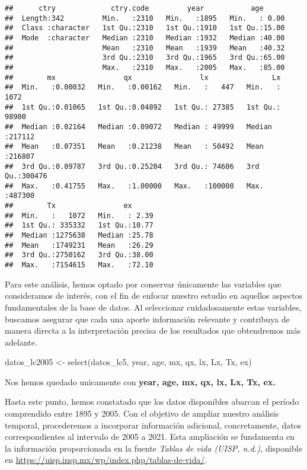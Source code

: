 \documentclass[
]{article}
\newenvironment{Shaded}{\begin{snugshade}}{\end{snugshade}}
\newcommand{\FunctionTok}[1]{\textcolor[rgb]{0.00,0.00,0.00}{#1}}
\newcommand{\NormalTok}[1]{#1}
\newcommand{\OtherTok}[1]{\textcolor[rgb]{0.56,0.35,0.01}{#1}}
\begin{document}
\begin{verbatim}
##      ctry             ctry.code         year           age       
##  Length:342         Min.   :2310   Min.   :1895   Min.   : 0.00  
##  Class :character   1st Qu.:2310   1st Qu.:1910   1st Qu.:15.00  
##  Mode  :character   Median :2310   Median :1932   Median :40.00  
##                     Mean   :2310   Mean   :1939   Mean   :40.32  
##                     3rd Qu.:2310   3rd Qu.:1965   3rd Qu.:65.00  
##                     Max.   :2310   Max.   :2005   Max.   :85.00  
##        mx                qx                lx               Lx        
##  Min.   :0.00032   Min.   :0.00162   Min.   :   447   Min.   :  1072  
##  1st Qu.:0.01065   1st Qu.:0.04892   1st Qu.: 27385   1st Qu.: 98900  
##  Median :0.02164   Median :0.09072   Median : 49999   Median :217112  
##  Mean   :0.07351   Mean   :0.21238   Mean   : 50492   Mean   :216807  
##  3rd Qu.:0.09787   3rd Qu.:0.25204   3rd Qu.: 74606   3rd Qu.:300476  
##  Max.   :0.41755   Max.   :1.00000   Max.   :100000   Max.   :487300  
##        Tx                ex       
##  Min.   :   1072   Min.   : 2.39  
##  1st Qu.: 335332   1st Qu.:10.77  
##  Median :1275638   Median :25.78  
##  Mean   :1749231   Mean   :26.29  
##  3rd Qu.:2750162   3rd Qu.:38.00  
##  Max.   :7154615   Max.   :72.10
\end{verbatim}

Para este análisis, hemos optado por conservar únicamente las variables
que consideramos de interés, con el fin de enfocar nuestro estudio en
aquellos aspectos fundamentales de la base de datos. Al seleccionar
cuidadosamente estas variables, buscamos asegurar que cada una aporte
información relevante y contribuya de manera directa a la interpretación
precisa de los resultados que obtendremos más adelante.

\begin{Shaded}
\begin{Highlighting}[]
\NormalTok{datos\_lc2005 }\OtherTok{\textless{}{-}} \FunctionTok{select}\NormalTok{(datos\_lc5, year, age, mx, qx, lx, Lx, Tx, ex)}
\end{Highlighting}
\end{Shaded}

Nos hemos quedado unicamente con \textbf{year, age, mx, qx, lx, Lx, Tx,
ex.}

Hasta este punto, hemos constatado que los datos disponibles abarcan el
período comprendido entre 1895 y 2005. Con el objetivo de ampliar
nuestro análisis temporal, procederemos a incorporar información
adicional, concretamente, datos correspondientes al intervalo de 2005 a
2021. Esta ampliación se fundamenta en la información proporcionada en
la fuente \emph{Tablas de vida (UISP, n.d.),} disponible en
\url{https://uisp.insp.mx/wp/index.php/tablas-de-vida/}.
\end{document}
